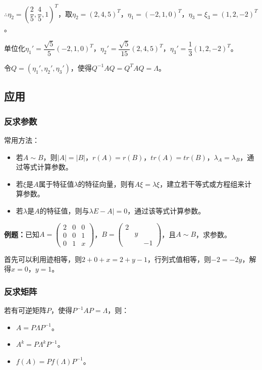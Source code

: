 \documentclass[UTF8, 12pt]{ctexart}
\begin{document}
$\therefore\eta_2=\left(\dfrac{2}{5},\dfrac{4}{5},1\right)^T$，取$\eta_2=(2,4,5)^T$，$\eta_1=(-2,1,0)^T$，$\eta_3=\xi_3=(1,2,-2)^T$。

单位化$\eta_1'=\dfrac{\sqrt{5}}{5}(-2,1,0)^T$，$\eta_2'=\dfrac{\sqrt{5}}{15}(2,4,5)^T$，$\eta_3'=\dfrac{1}{3}(1,2,-2)^T$。

令$Q=(\eta_1',\eta_2',\eta_3')$，使得$Q^{-1}AQ=Q^TAQ=\Lambda$。

\subsection{应用}

\subsubsection{反求参数}

常用方法：

\begin{itemize}
    \item 若$A\sim B$，则$\vert A\vert=\vert B\vert$，$r(A)=r(B)$，$tr(A)=tr(B)$，$\lambda_A=\lambda_B$，通过等式计算参数。
    \item 若$\xi$是$A$属于特征值$\lambda$的特征向量，则有$A\xi=\lambda\xi$，建立若干等式或方程组来计算参数。
    \item 若$\lambda$是$A$的特征值，则与$\lambda E-A\vert=0$，通过该等式计算参数。
\end{itemize}

\textbf{例题：}已知$A=\left(\begin{array}{ccc}
    2 & 0 & 0 \\
    0 & 0 & 1 \\
    0 & 1 & x
\end{array}\right)$，$B=\left(\begin{array}{ccc}
    2 \\
     & y \\
     & & -1
\end{array}\right)$，且$A\sim B$，求参数。\medskip

首先可以利用迹相等，则$2+0+x=2+y-1$，行列式值相等，则$-2=-2y$，解得$x=0$，$y=1$。

\subsubsection{反求矩阵}

若有可逆矩阵$P$，使得$P^{-1}AP=\Lambda$，则：

\begin{itemize}
    \item $A=P\Lambda P^{-1}$。
    \item $A^k=P\Lambda^kP^{-1}$。
    \item $f(A)=Pf(\Lambda)P^{-1}$。
\end{itemize}
\end{document}
